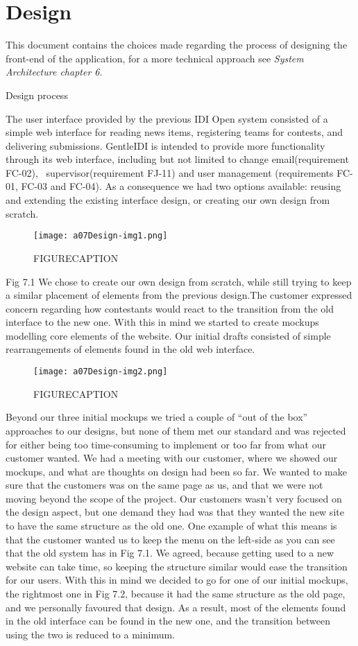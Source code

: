 \section{Design}
This document contains the choices made regarding the process of
designing the front-end of the application, for a more technical
approach see \textit{System Architecture chapter 6}.

Design process

The user interface provided by the previous IDI Open system consisted of
a simple web interface for reading news items, registering teams for
contests, and delivering submissions. GentleIDI is intended to provide
more functionality through its web interface, including but not limited
to change email(requirement FC-02), \ supervisor(requirement FJ-11) and
user management (requirements FC-01, FC-03 and FC-04). As a consequence
we had two options available: reusing and extending the existing
interface design, or creating our own design from scratch.

\begin{figure}[h!]
	\texttt{[image: a07Design-img1.png]} 
	\caption{FIGURECAPTION}
\end{figure}
Fig 7.1
We chose to create our own design from scratch, while still trying to
keep a similar placement of elements from the previous design.The
customer expressed concern regarding how contestants would react to the
transition from the old interface to the new one. With this in mind we
started to create mockups modelling core elements of the website. Our
initial drafts consisted of simple rearrangements of elements found in
the old web interface.

\begin{figure}[h!]
	\texttt{[image: a07Design-img2.png]} 
	\caption{FIGURECAPTION}
\end{figure}

Beyond our three initial mockups we tried a couple of ``out
of the box'' approaches to our designs, but none of them
met our standard and was rejected for either being too time-consuming
to implement or too far from what our customer wanted. We had a meeting
with our customer, where we showed our mockups, and what are thoughts
on design had been so far. We wanted to make sure that the customers
was on the same page as us, and that we were not moving beyond the
scope of the project. Our customers wasn't very focused
on the design aspect, but one demand they had was that they wanted the
new site to have the same structure as the old one. One example of what
this means is that the customer wanted us to keep the menu on the
left-side as you can see that the old system has in Fig 7.1. We agreed,
because getting used to a new website can take time, so keeping the
structure similar would ease the transition for our users. With this in
mind we decided to go for one of our initial mockups, the rightmost one
in Fig 7.2, because it had the same structure as the old page, and we
personally favoured that design. As a result, most of the elements
found in the old interface can be found in the new one, and the
transition between using the two is reduced to a minimum.

